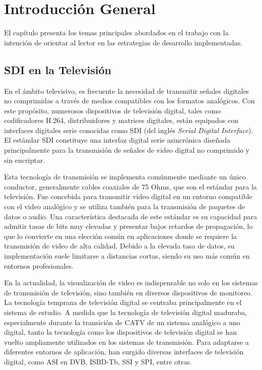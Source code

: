 
\chapter{Introducción General} %

\label{Chapter1} %

El capítulo presenta los temas principales abordados en el trabajo con la
intención de orientar al lector en las estrategias de desarrollo
implementadas. 

\section{SDI en la Televisión}

En el ámbito televisivo, es frecuente la necesidad de transmitir señales
digitales no comprimidas a través de medios compatibles con los formatos
analógicos. Con este propósito, numerosos dispositivos de televisión digital,
tales como codificadores H.264, distribuidores y matrices digitales, están
equipados con interfaces digitales serie conocidas como SDI (del inglés
\textit{Serial Digital Interface}). El estándar SDI constituye una interfaz
digital serie asincrónica diseñada principalmente para la transmisión de señales
de video digital no comprimido y sin encriptar.

Esta tecnología de transmisión se implementa comúnmente mediante un único
conductor, generalmente cables coaxiales de 75 Ohms, que son el estándar para
la televisión. Fue concebida para transmitir video digital en un entorno
compatible con el video analógico y se utiliza también para la transmisión de
paquetes de datos o audio. Una característica destacada de este estándar es su
capacidad para admitir tasas de bits muy elevadas y presentar bajos retardos de
propagación, lo que lo convierte en una elección común en aplicaciones donde se
requiere la transmisión de video de alta calidad. Debido a la elevada tasa de
datos, su implementación suele limitarse a distancias cortas, siendo su uso más
común en entornos profesionales.

En la actualidad, la visualización de video es indispensable no solo en los
sistemas de transmisión de televisión, sino también en diversos dispositivos de
monitoreo. La tecnología temprana de televisión digital se centraba
principalmente en el sistema de estudio. A medida que la tecnología de
televisión digital maduraba, especialmente durante la transición de CATV de un
sistema analógico a uno digital, tanto la tecnología como los dispositivos de
televisión digital se han vuelto ampliamente utilizados en los sistemas de
transmisión. Para adaptarse a diferentes entornos de aplicación, han surgido
diversas interfaces de televisión digital, como ASI en DVB, ISBD-Tb, SSI y SPI,
entre otras.

